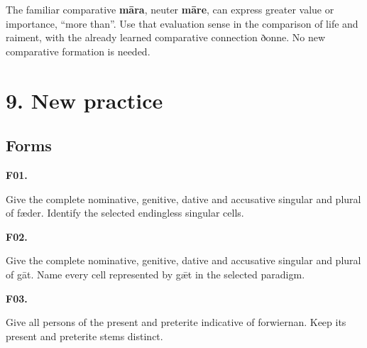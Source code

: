 The familiar comparative \textbf{māra}, neuter \textbf{māre}, can express greater value or importance, “more than”. Use that evaluation sense in the comparison of life and raiment, with the already learned comparative connection ðonne. No new comparative formation is needed.

\section*{9. New practice}

\subsection*{Forms}

\par\begin{minipage}{\linewidth}\raggedright
\textbf{F01.}

Give the complete nominative, genitive, dative and accusative singular and plural of fæder. Identify the selected endingless singular cells.

\end{minipage}\par\addvspace{4pt}

\par\begin{minipage}{\linewidth}\raggedright
\textbf{F02.}

Give the complete nominative, genitive, dative and accusative singular and plural of gāt. Name every cell represented by gǣt in the selected paradigm.

\end{minipage}\par\addvspace{4pt}

\par\begin{minipage}{\linewidth}\raggedright
\textbf{F03.}

Give all persons of the present and preterite indicative of forwiernan. Keep its present and preterite stems distinct.

\end{minipage}\par\addvspace{4pt}

